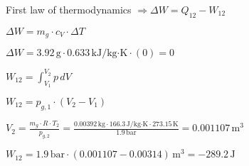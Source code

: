 First law of thermodynamics \( \Rightarrow \Delta W = Q_{12} - W_{12} \)  

\( \Delta W = m_g \cdot c_V \cdot \Delta T \)  

\( \Delta W = 3.92 \, \text{g} \cdot 0.633 \, \text{kJ/kg·K} \cdot (0) = 0 \)  

\( W_{12} = \int_{V_1}^{V_2} p \, dV \)  

\( W_{12} = p_{g,1} \cdot (V_2 - V_1) \)  

\( V_2 = \frac{m_g \cdot R \cdot T_2}{p_{g,2}} = \frac{0.00392 \, \text{kg} \cdot 166.3 \, \text{J/kg·K} \cdot 273.15 \, \text{K}}{1.9 \, \text{bar}} = 0.001107 \, \text{m}^3 \)  

\( W_{12} = 1.9 \, \text{bar} \cdot (0.001107 - 0.00314) \, \text{m}^3 = -289.2 \, \text{J} \)